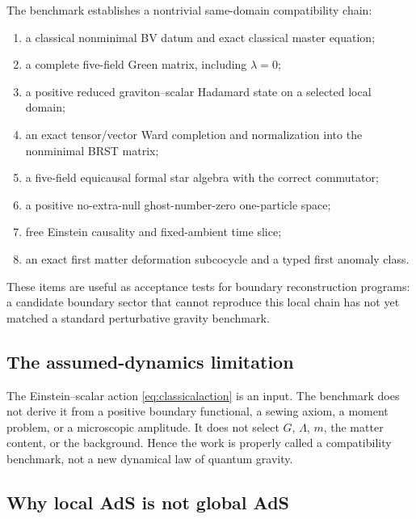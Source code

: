 \documentclass[11pt]{article}
\theoremstyle{definition}
\theoremstyle{remark}
\begin{document}
The benchmark establishes a nontrivial same-domain compatibility chain:
\begin{enumerate}[label=(\roman*)]
 \item a classical nonminimal BV datum and exact classical master equation;
 \item a complete five-field Green matrix, including $\lambda=0$;
 \item a positive reduced graviton--scalar Hadamard state on a selected local domain;
 \item an exact tensor/vector Ward completion and normalization into the nonminimal
       BRST matrix;
 \item a five-field equicausal formal star algebra with the correct commutator;
 \item a positive no-extra-null ghost-number-zero one-particle space;
 \item free Einstein causality and fixed-ambient time slice;
 \item an exact first matter deformation subcocycle and a typed first anomaly class.
\end{enumerate}
These items are useful as acceptance tests for boundary reconstruction programs: a
candidate boundary sector that cannot reproduce this local chain has not yet matched a
standard perturbative gravity benchmark.

\subsection{The assumed-dynamics limitation}

The Einstein--scalar action \cref{eq:classicalaction} is an input.  The benchmark does
not derive it from a positive boundary functional, a sewing axiom, a moment problem, or
a microscopic amplitude.  It does not select $G$, $\Lambda$, $m$, the matter content,
or the background.  Hence the work is properly called a compatibility benchmark, not
a new dynamical law of quantum gravity.

\subsection{Why local AdS is not global AdS}
\end{document}
